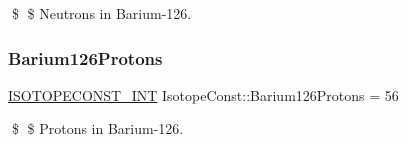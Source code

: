 \$ \$ Neutrons in Barium-\/126. \mbox{\label{group___isotope_const-_barium-_ba126_ga851d62be20d251ac9102db4a70505724}} 
\subsubsection{\texorpdfstring{Barium126\+Protons}{Barium126Protons}}
{\footnotesize\ttfamily \mbox{\hyperlink{group___isotope_const-_macros_ga5f18360b3e99483a35c32d789e62621c}{I\+S\+O\+T\+O\+P\+E\+C\+O\+N\+S\+T\+\_\+\+I\+NT}} Isotope\+Const\+::\+Barium126\+Protons = 56}

\$ \$ Protons in Barium-\/126. 